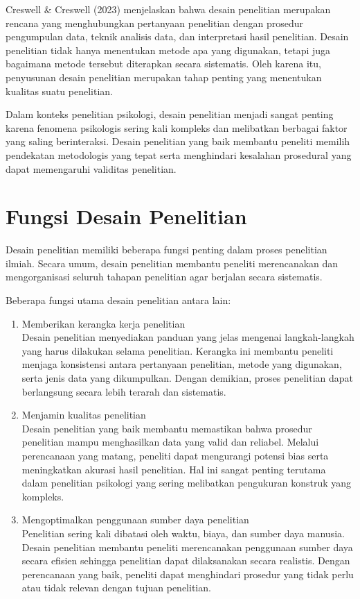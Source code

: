 \documentclass[
  indonesian,
  letterpaper,
  DIV=11,
  numbers=noendperiod]{scrreprt}
\providecommand{\tightlist}{%
  \setlength{\itemsep}{0pt}\setlength{\parskip}{0pt}}
\begin{document}
Creswell \& Creswell (2023) menjelaskan bahwa desain penelitian
merupakan rencana yang menghubungkan pertanyaan penelitian dengan
prosedur pengumpulan data, teknik analisis data, dan interpretasi hasil
penelitian. Desain penelitian tidak hanya menentukan metode apa yang
digunakan, tetapi juga bagaimana metode tersebut diterapkan secara
sistematis. Oleh karena itu, penyusunan desain penelitian merupakan
tahap penting yang menentukan kualitas suatu penelitian.

Dalam konteks penelitian psikologi, desain penelitian menjadi sangat
penting karena fenomena psikologis sering kali kompleks dan melibatkan
berbagai faktor yang saling berinteraksi. Desain penelitian yang baik
membantu peneliti memilih pendekatan metodologis yang tepat serta
menghindari kesalahan prosedural yang dapat memengaruhi validitas
penelitian.

\section{Fungsi Desain Penelitian}\label{fungsi-desain-penelitian}

Desain penelitian memiliki beberapa fungsi penting dalam proses
penelitian ilmiah. Secara umum, desain penelitian membantu peneliti
merencanakan dan mengorganisasi seluruh tahapan penelitian agar berjalan
secara sistematis.

Beberapa fungsi utama desain penelitian antara lain:

\begin{enumerate}
\def\labelenumi{\arabic{enumi}.}
\tightlist
\item
  Memberikan kerangka kerja penelitian\\
  Desain penelitian menyediakan panduan yang jelas mengenai
  langkah-langkah yang harus dilakukan selama penelitian. Kerangka ini
  membantu peneliti menjaga konsistensi antara pertanyaan penelitian,
  metode yang digunakan, serta jenis data yang dikumpulkan. Dengan
  demikian, proses penelitian dapat berlangsung secara lebih terarah dan
  sistematis.
\item
  Menjamin kualitas penelitian\\
  Desain penelitian yang baik membantu memastikan bahwa prosedur
  penelitian mampu menghasilkan data yang valid dan reliabel. Melalui
  perencanaan yang matang, peneliti dapat mengurangi potensi bias serta
  meningkatkan akurasi hasil penelitian. Hal ini sangat penting terutama
  dalam penelitian psikologi yang sering melibatkan pengukuran konstruk
  yang kompleks.
\item
  Mengoptimalkan penggunaan sumber daya penelitian\\
  Penelitian sering kali dibatasi oleh waktu, biaya, dan sumber daya
  manusia. Desain penelitian membantu peneliti merencanakan penggunaan
  sumber daya secara efisien sehingga penelitian dapat dilaksanakan
  secara realistis. Dengan perencanaan yang baik, peneliti dapat
  menghindari prosedur yang tidak perlu atau tidak relevan dengan tujuan
  penelitian.
\end{enumerate}
\end{document}

